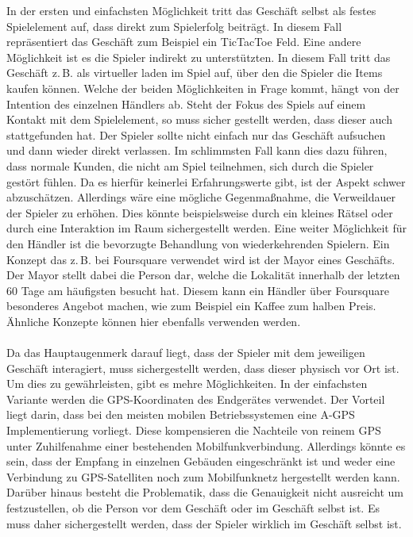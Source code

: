 In der ersten und einfachsten Möglichkeit tritt das Geschäft selbst als festes Spielelement auf, dass direkt zum Spielerfolg beiträgt. In diesem Fall repräsentiert das Geschäft zum Beispiel ein TicTacToe Feld. Eine andere Möglichkeit ist es die Spieler indirekt zu unterstützten. In diesem Fall tritt das Geschäft z.\,B. als virtueller laden im Spiel auf, über den die Spieler die Items kaufen können.
Welche der beiden Möglichkeiten in Frage kommt, hängt von der Intention des einzelnen Händlers ab. Steht der Fokus des Spiels auf einem Kontakt mit dem Spielelement, so 
muss sicher gestellt werden, dass dieser auch stattgefunden hat. Der Spieler sollte nicht einfach nur das Geschäft aufsuchen und dann wieder direkt verlassen. Im schlimmsten Fall kann dies dazu führen, dass normale Kunden, die nicht am Spiel teilnehmen, sich durch die Spieler gestört fühlen.
Da es hierfür keinerlei Erfahrungswerte gibt, ist der Aspekt schwer abzuschätzen. Allerdings wäre eine mögliche Gegenmaßnahme, die Verweildauer der Spieler zu erhöhen. 
Dies könnte beispielsweise durch  ein kleines Rätsel oder durch eine Interaktion im Raum  sichergestellt werden.
Eine weiter Möglichkeit für den Händler ist die bevorzugte Behandlung von wiederkehrenden Spielern. Ein Konzept das z.\,B. bei Foursquare verwendet wird ist der Mayor eines Geschäfts. Der Mayor stellt dabei die Person dar, welche die Lokalität innerhalb der letzten 60 Tage am häufigsten besucht hat. Diesem kann ein Händler über Foursquare besonderes Angebot machen, wie zum Beispiel ein Kaffee zum halben Preis.\cite{Lindqvist.2011} Ähnliche Konzepte können hier ebenfalls verwenden werden.
\\\\
Da das Hauptaugenmerk darauf liegt, dass der Spieler mit dem jeweiligen Geschäft interagiert, muss sichergestellt werden, dass dieser physisch vor Ort ist. 
Um dies zu gewährleisten, gibt es mehre Möglichkeiten. In der einfachsten Variante werden die GPS-Koordinaten des Endgerätes verwendet. Der Vorteil liegt darin, dass bei den meisten mobilen Betriebssystemen eine A-GPS Implementierung vorliegt. Diese kompensieren die Nachteile von reinem GPS unter Zuhilfenahme einer bestehenden Mobilfunkverbindung.\cite{Djuknic.2001} Allerdings könnte es sein, dass der Empfang in einzelnen Gebäuden eingeschränkt ist und weder eine Verbindung zu GPS-Satelliten noch zum Mobilfunknetz hergestellt werden kann. Darüber hinaus besteht die Problematik, dass die Genauigkeit nicht ausreicht um festzustellen, ob die Person vor dem Geschäft oder im Geschäft selbst ist.
Es muss daher sichergestellt werden, dass der Spieler wirklich im Geschäft selbst ist.
